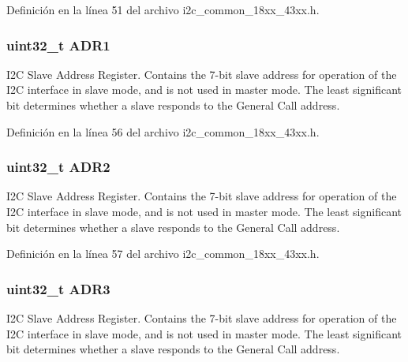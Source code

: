 Definición en la línea 51 del archivo i2c\+\_\+common\+\_\+18xx\+\_\+43xx.\+h.

\subsubsection[{\texorpdfstring{A\+D\+R1}{ADR1}}]{ uint32\+\_\+t A\+D\+R1}\hypertarget{struct_l_p_c___i2_c___t_af3d33330dee9193734ffbca23c7ed379}{}\label{struct_l_p_c___i2_c___t_af3d33330dee9193734ffbca23c7ed379}
I2C Slave Address Register. Contains the 7-\/bit slave address for operation of the I2C interface in slave mode, and is not used in master mode. The least significant bit determines whether a slave responds to the General Call address. 

Definición en la línea 56 del archivo i2c\+\_\+common\+\_\+18xx\+\_\+43xx.\+h.

\subsubsection[{\texorpdfstring{A\+D\+R2}{ADR2}}]{ uint32\+\_\+t A\+D\+R2}\hypertarget{struct_l_p_c___i2_c___t_a84a95bb11dc53608632b82f437bfd5a8}{}\label{struct_l_p_c___i2_c___t_a84a95bb11dc53608632b82f437bfd5a8}
I2C Slave Address Register. Contains the 7-\/bit slave address for operation of the I2C interface in slave mode, and is not used in master mode. The least significant bit determines whether a slave responds to the General Call address. 

Definición en la línea 57 del archivo i2c\+\_\+common\+\_\+18xx\+\_\+43xx.\+h.

\subsubsection[{\texorpdfstring{A\+D\+R3}{ADR3}}]{ uint32\+\_\+t A\+D\+R3}\hypertarget{struct_l_p_c___i2_c___t_a9822c81e3eadedb60b684dd57631fb7b}{}\label{struct_l_p_c___i2_c___t_a9822c81e3eadedb60b684dd57631fb7b}
I2C Slave Address Register. Contains the 7-\/bit slave address for operation of the I2C interface in slave mode, and is not used in master mode. The least significant bit determines whether a slave responds to the General Call address. 

